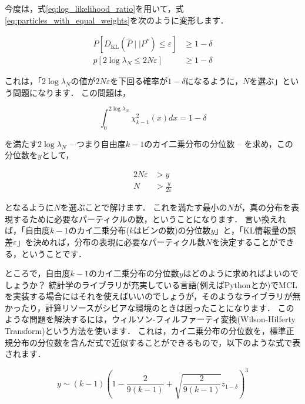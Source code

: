 \documentclass[{../../master}]{subfiles}
\begin{document}
今度は，式\ref{eq:log_likelihood_ratio}を用いて，式\ref{eq:particles_with_equal_weights}を次のように変形します．

\begin{equation}
  \begin{split}
    P[D_{\text{KL}}(\hat{P} \mid \mid P^{*}) \leq \varepsilon] &\geq 1 - \delta \\
    p[2\log{\lambda_{N}} \leq 2N\varepsilon] &\geq 1 - \delta
  \end{split}
\end{equation}

これは，「$2\log{\lambda_{N}}$の値が$2N\varepsilon$を下回る確率が$1 - \delta$になるように，$N$を選ぶ」という問題になります．
この問題は，

\begin{equation}
  \int^{2\log{\lambda_{N}}}_{0} \chi^{2}_{k-1}(x) dx = 1 - \delta
\end{equation}

\noindent
を満たす$2\log{\lambda_{N}}$ -- つまり自由度$k-1$のカイ二乗分布の分位数 -- を求め，この分位数を$y$として，

\begin{equation}
  \begin{split}
    2N\varepsilon &> y \\
    N &> \frac{y}{2\varepsilon}
  \end{split}
\end{equation}

\noindent
となるように$N$を選ぶことで解けます．
これを満たす最小の$N$が，真の分布を表現するために必要なパーティクルの数，ということになります．
言い換えれば，「自由度$k-1$のカイ二乗分布($k$はビンの数)の分位数$y$」と，「KL情報量の誤差$\varepsilon$」を決めれば，分布の表現に必要なパーティクル数$N$を決定することができる，ということです．

ところで，自由度$k-1$のカイ二乗分布の分位数$y$はどのように求めればよいのでしょうか？
統計学のライブラリが充実している言語(例えばPythonとか)でMCLを実装する場合にはそれを使えばいいのでしょうが，そのようなライブラリが無かったり，計算リソースがシビアな環境のときは困ったことになります．
このような問題を解決するには，ウィルソン-フィルファーティ変換(Wilson-Hilferty Transform)という方法を使います．
これは，カイ二乗分布の分位数を，標準正規分布の分位数を含んだ式で近似することができるもので，以下のような式で表されます．

\begin{equation}
  y \sim (k-1) \left( 1 - \frac{2}{9(k-1)} + \sqrt{\frac{2}{9(k-1)}}z_{1-\delta} \right) ^{3}
\end{equation}
\end{document}
